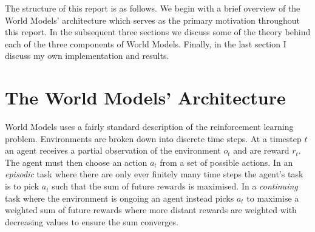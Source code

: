 \documentclass{article}
\numberwithin{figure}{section}
\theoremstyle{definition}
\begin{document}


The structure of this report is as follows.
We begin with a brief overview of the World Models' architecture which serves as the primary motivation throughout this report.
In the subsequent three sections we discuss some of the theory behind each of the three components of World Models.
Finally, in the last section I discuss my own implementation and results.

\section{The World Models' Architecture}
World Models uses a fairly standard description of the reinforcement learning problem.
Environments are broken down into discrete time steps.
At a timestep $t$ an agent receives a partial observation of the environment $o_t$ and are reward $r_t$.
The agent must then choose an action $a_t$ from a set of possible actions.
In an \textit{episodic} task where there are only ever finitely many time steps the agent's task is to pick $a_t$ such that the sum of future rewards is maximised.
In a \textit{continuing} task where the environment is ongoing an agent instead picks $a_t$ to maximise a weighted sum of future rewards where more distant rewards are weighted with decreasing values to ensure the sum converges.
\end{document}
